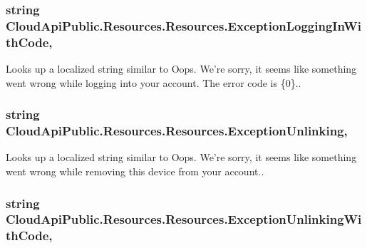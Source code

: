 \hypertarget{class_cloud_api_public_1_1_resources_1_1_resources_a091b4f8c09d926a27ef6e15a7dbcd279}{
\subsubsection[{Exception\-Logging\-In\-With\-Code}]{\setlength{\rightskip}{0pt plus 5cm}string Cloud\-Api\-Public.\-Resources.\-Resources.\-Exception\-Logging\-In\-With\-Code\hspace{0.3cm}{\ttfamily [static]}, {\ttfamily [get]}}}\label{class_cloud_api_public_1_1_resources_1_1_resources_a091b4f8c09d926a27ef6e15a7dbcd279}


Looks up a localized string similar to Oops. We're sorry, it seems like something went wrong while logging into your account. The error code is \{0\}.. 

\hypertarget{class_cloud_api_public_1_1_resources_1_1_resources_aeeb1b258cfd57eff1a315794865f189b}{
\subsubsection[{Exception\-Unlinking}]{\setlength{\rightskip}{0pt plus 5cm}string Cloud\-Api\-Public.\-Resources.\-Resources.\-Exception\-Unlinking\hspace{0.3cm}{\ttfamily [static]}, {\ttfamily [get]}}}\label{class_cloud_api_public_1_1_resources_1_1_resources_aeeb1b258cfd57eff1a315794865f189b}


Looks up a localized string similar to Oops. We're sorry, it seems like something went wrong while removing this device from your account.. 

\hypertarget{class_cloud_api_public_1_1_resources_1_1_resources_a469d7e53ae6aa81528b38ea8f5758890}{
\subsubsection[{Exception\-Unlinking\-With\-Code}]{\setlength{\rightskip}{0pt plus 5cm}string Cloud\-Api\-Public.\-Resources.\-Resources.\-Exception\-Unlinking\-With\-Code\hspace{0.3cm}{\ttfamily [static]}, {\ttfamily [get]}}}\label{class_cloud_api_public_1_1_resources_1_1_resources_a469d7e53ae6aa81528b38ea8f5758890}



